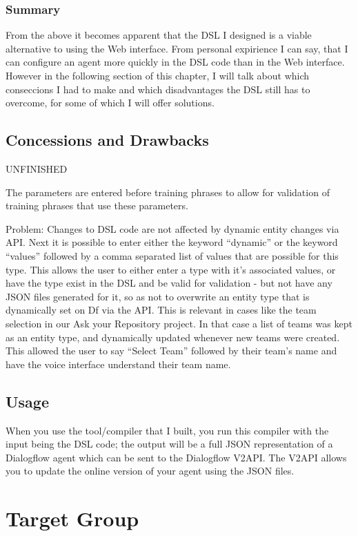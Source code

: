 \subsubsection{Summary}
From the above it becomes apparent that the DSL I designed is a viable alternative to using the Web interface.
From personal expirience I can say, that I can configure an agent more quickly in the DSL code than in the Web interface. However in the following section of this chapter, I will talk about which conseccions I had to make and which disadvantages the DSL still has to overcome, for some of which I will offer solutions.

\subsection{Concessions and Drawbacks}
UNFINISHED

The parameters are entered before training phrases to allow for validation of training phrases that use these parameters.

Problem: Changes to DSL code are not affected by dynamic entity changes via API.
Next it is possible to enter either the keyword “dynamic” or the keyword “values” followed by a comma separated list of values that are possible for this type.
This allows the user to either enter a type with it’s associated values, or have the type exist in the DSL and be valid for validation - but not have any JSON files generated for it, so as not to overwrite an entity type that is dynamically set on Df via the API.
This is relevant in cases like the team selection in our Ask your Repository project.
In that case a list of teams was kept as an entity type, and dynamically updated whenever new teams were created. This allowed the user to say “Select Team” followed by their team’s name and have the voice interface understand their team name.

\subsection{Usage}
When you use the tool/compiler that I built, you run this compiler with the input being the DSL code; the output will be a full JSON representation of a Dialogflow agent which can be sent to the Dialogflow V2API.
The V2API allows you to update the online version of your agent using the JSON files.


\section{Target Group}

